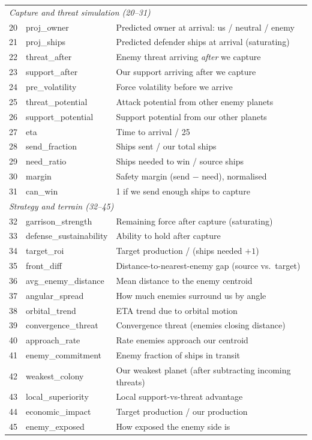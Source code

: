 \documentclass[conference]{IEEEtran}
\begin{document}
\begin{table}[htbp]
\begin{tabular}{clp{8.5cm}}
\midrule
\multicolumn{3}{l}{\textit{Capture and threat simulation (20--31)}} \\
20 & proj\_owner & Predicted owner at arrival: us / neutral / enemy \\
21 & proj\_ships & Predicted defender ships at arrival (saturating) \\
22 & threat\_after & Enemy threat arriving \textit{after} we capture \\
23 & support\_after & Our support arriving after we capture \\
24 & pre\_volatility & Force volatility before we arrive \\
25 & threat\_potential & Attack potential from other enemy planets \\
26 & support\_potential & Support potential from our other planets \\
27 & eta & Time to arrival / 25 \\
28 & send\_fraction & Ships sent / our total ships \\
29 & need\_ratio & Ships needed to win / source ships \\
30 & margin & Safety margin (send $-$ need), normalised \\
31 & can\_win & 1 if we send enough ships to capture \\
\midrule
\multicolumn{3}{l}{\textit{Strategy and terrain (32--45)}} \\
32 & garrison\_strength & Remaining force after capture (saturating) \\
33 & defense\_sustainability & Ability to hold after capture \\
34 & target\_roi & Target production / (ships needed $+ 1$) \\
35 & front\_diff & Distance-to-nearest-enemy gap (source vs.\ target) \\
36 & avg\_enemy\_distance & Mean distance to the enemy centroid \\
37 & angular\_spread & How much enemies surround us by angle \\
38 & orbital\_trend & ETA trend due to orbital motion \\
39 & convergence\_threat & Convergence threat (enemies closing distance) \\
40 & approach\_rate & Rate enemies approach our centroid \\
41 & enemy\_commitment & Enemy fraction of ships in transit \\
42 & weakest\_colony & Our weakest planet (after subtracting incoming threats) \\
43 & local\_superiority & Local support-vs-threat advantage \\
44 & economic\_impact & Target production / our production \\
45 & enemy\_exposed & How exposed the enemy side is \\
\bottomrule
\end{tabular}
\end{table}
\end{document}
